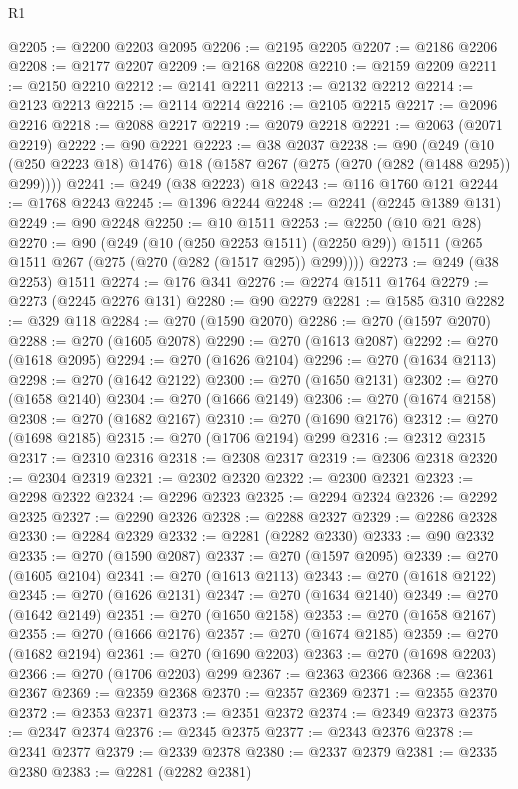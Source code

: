\begin{lexlean}{R1}
\begin{coremodule}
@2205 := @2200 @2203 @2095
@2206 := @2195 @2205
@2207 := @2186 @2206
@2208 := @2177 @2207
@2209 := @2168 @2208
@2210 := @2159 @2209
@2211 := @2150 @2210
@2212 := @2141 @2211
@2213 := @2132 @2212
@2214 := @2123 @2213
@2215 := @2114 @2214
@2216 := @2105 @2215
@2217 := @2096 @2216
@2218 := @2088 @2217
@2219 := @2079 @2218
@2221 := @2063 (@2071 @2219)
@2222 := @90 @2221
@2223 := @38 @2037
@2238 := @90
    (@249 (@10 (@250 @2223 @18) @1476) @18 (@1587 @267 (@275 (@270 (@282 (@1488 @295)) @299))))
@2241 := @249 (@38 @2223) @18
@2243 := @116 @1760 @121
@2244 := @1768 @2243
@2245 := @1396 @2244
@2248 := @2241 (@2245 @1389 @131)
@2249 := @90 @2248
@2250 := @10 @1511
@2253 := @2250 (@10 @21 @28)
@2270 := @90
    (@249
      (@10 (@250 @2253 @1511) (@2250 @29))
      @1511
      (@265 @1511 @267 (@275 (@270 (@282 (@1517 @295)) @299))))
@2273 := @249 (@38 @2253) @1511
@2274 := @176 @341
@2276 := @2274 @1511 @1764
@2279 := @2273 (@2245 @2276 @131)
@2280 := @90 @2279
@2281 := @1585 @310
@2282 := @329 @118
@2284 := @270 (@1590 @2070)
@2286 := @270 (@1597 @2070)
@2288 := @270 (@1605 @2078)
@2290 := @270 (@1613 @2087)
@2292 := @270 (@1618 @2095)
@2294 := @270 (@1626 @2104)
@2296 := @270 (@1634 @2113)
@2298 := @270 (@1642 @2122)
@2300 := @270 (@1650 @2131)
@2302 := @270 (@1658 @2140)
@2304 := @270 (@1666 @2149)
@2306 := @270 (@1674 @2158)
@2308 := @270 (@1682 @2167)
@2310 := @270 (@1690 @2176)
@2312 := @270 (@1698 @2185)
@2315 := @270 (@1706 @2194) @299
@2316 := @2312 @2315
@2317 := @2310 @2316
@2318 := @2308 @2317
@2319 := @2306 @2318
@2320 := @2304 @2319
@2321 := @2302 @2320
@2322 := @2300 @2321
@2323 := @2298 @2322
@2324 := @2296 @2323
@2325 := @2294 @2324
@2326 := @2292 @2325
@2327 := @2290 @2326
@2328 := @2288 @2327
@2329 := @2286 @2328
@2330 := @2284 @2329
@2332 := @2281 (@2282 @2330)
@2333 := @90 @2332
@2335 := @270 (@1590 @2087)
@2337 := @270 (@1597 @2095)
@2339 := @270 (@1605 @2104)
@2341 := @270 (@1613 @2113)
@2343 := @270 (@1618 @2122)
@2345 := @270 (@1626 @2131)
@2347 := @270 (@1634 @2140)
@2349 := @270 (@1642 @2149)
@2351 := @270 (@1650 @2158)
@2353 := @270 (@1658 @2167)
@2355 := @270 (@1666 @2176)
@2357 := @270 (@1674 @2185)
@2359 := @270 (@1682 @2194)
@2361 := @270 (@1690 @2203)
@2363 := @270 (@1698 @2203)
@2366 := @270 (@1706 @2203) @299
@2367 := @2363 @2366
@2368 := @2361 @2367
@2369 := @2359 @2368
@2370 := @2357 @2369
@2371 := @2355 @2370
@2372 := @2353 @2371
@2373 := @2351 @2372
@2374 := @2349 @2373
@2375 := @2347 @2374
@2376 := @2345 @2375
@2377 := @2343 @2376
@2378 := @2341 @2377
@2379 := @2339 @2378
@2380 := @2337 @2379
@2381 := @2335 @2380
@2383 := @2281 (@2282 @2381)

\end{coremodule}
\end{lexlean}
